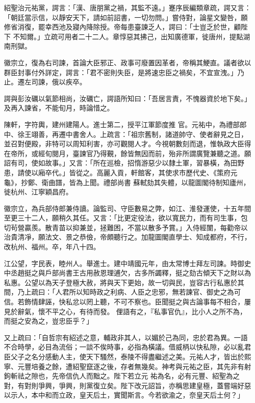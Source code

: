 \begin{pinyinscope}
 紹聖治元祐黨，諤言：「漢、唐朋黨之禍，其監不遠。」蹇序辰編類章疏，諤又言：「朝廷當示信，以靜安天下，請如前詔書，一切勿問。」嘗侍對，論星文變咎，願修省消復，罷幸西池及寢內降除授。帝每患臺諫乏人，諤曰：「士豈乏於世，顧陛下
 不知爾。」立疏可用者二十二人。章惇惡其拂己，出知廣德軍，徙唐州，提點湖南刑獄。



 徽宗立，復為右司諫，首論大臣邪正、政事可廢置因革者，帝稱其鯁直。議者欲以群臣封事付外詳定，諤言：「君不密則失臣，是將速忠臣之禍矣，不宜宣洩。」乃止。遷左司諫，俄以疾卒。



 諤與彭汝礪以氣節相尚，汝礪亡，諤語所知曰：「吾居言責，不愧器資於地下矣。」及再入諫省，不能旬月，時論惜之。



 陳軒，字符輿，建州建陽人。進士第二，授平江軍節度推
 官。元祐中，為禮部郎中、徐王翊善，再遷中書舍人。上疏言：「祖宗舊制，諸道帥守、使者辭見之日，並召對便殿，非特可以周知利害，亦可觀閱人才。今視朝數刻而退，惟執政大臣得在帝所，或經旬閱月，臺諫官乃得覲，餘皆無因而前，殆非所謂廣覽兼聽之道。願詔有司，使如故事。」又言：「所在巡檢，招惰游惡少以隸土軍，習暴橫，為田野患，請使以廂卒代。」皆從之。高麗入貢，軒館客，其使求市歷代史、《策府元龜》，抄鄭、衛曲譜，皆為上聞。禮部尚書
 蘇軾劾其失體，以龍圖閣待制知廬州，徙杭州、江寧穎昌府。



 徽宗立，為兵部侍郎兼侍讀。論監司、守臣數易之弊，如江、淮發運使，十五年間至更三十二人，願稍久其任。又言：「比更定役法，欲以寬民力，而有司生事，包切茍營贏羨。散青苗以抑兼並，拯難困，不當以散多予賞。」入侍經闈，每勸帝以治貴清凈，願法文、景之恭儉，帝頗聽行之。加龍圖閣直學士、知成都府，不行，改杭州、福州。卒，年八十四。



 江公望，字民表，睦州人。舉進士。建中靖國元年，由太常博士拜左司諫。時御史中丞趙挺之與戶部尚書王古用赦恩理逋欠，古多所蠲釋，挺之劾古傾天下之財以為私惠。公望以為天子登極大赦，將與天下更始，故一切與民，豈容古行私惠於其間，乃上疏曰：「人君所以知時政之利病、人臣之忠邪，無若諫官、御史之為可信。若飾情肆誣，快私忿以罔上聽，不可不察也。臣聞挺之與古論事每不相合，屢見於辭氣，懷不平之心，有待而發。
 俚語有之，『私事官仇』，比小人之所不為，而挺之安為之，豈忠臣乎？」



 又上疏曰：「自哲宗有紹述之意，輔政非其人，以媚於己為同，忠於君為異。一語不合時學，必目為流俗；一談不俟時事，必指為橫議。借威柄以快私隙，必以亂君臣父子之名分感動人主，使天下騷然，泰陵不得盡繼述之美。元祐人才，皆出於熙寧、元豐培養之餘，遭紹聖竄逐之後，存者無幾矣。神考與元祐之臣，其先非有射鉤斬祛之隙也，先帝信仇人而黜之。陛下若立元
 祐為名，必有元豐、紹聖為之對，有對則爭興，爭興，則黨復立矣。陛下改元詔旨，亦稱思建皇極，蓋嘗端好惡以示人，本中和而立政，皇天后土，實聞斯言。今若欲渝之，奈皇天后土何？」




\end{pinyinscope}
